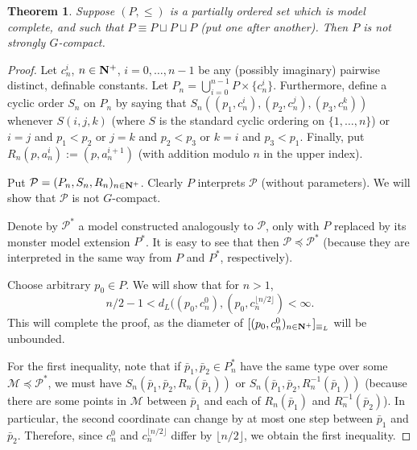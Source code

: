 \documentclass[final,a4paper,12pt]{amsart}
\newtheorem{thm}{Theorem}[section]
\theoremstyle{remark}
\theoremstyle{definition}
\newtheorem{clm}{Claim}
\newenvironment{clmproof}[1][\proofname]{\proof[#1]\renewcommand{\qedsymbol}{$\square$(claim)}}{\endproof}
\DeclareMathOperator{\Th}{{Th}}
\begin{document}
	\begin{thm}
		Suppose $(P,\leq)$ is a partially ordered set which is model complete, and such that $P\equiv P\sqcup P\sqcup P$ (put one after another). Then $P$ is not strongly $G$-compact.
	\end{thm}
	\begin{proof}
		Let $c_n^i$, $n\in {\bf N}^+$, $i=0,\ldots,n-1$ be any (possibly imaginary) pairwise distinct, definable constants. Let $P_n=\bigcup_{i=0}^{n-1} P\times \{c_n^i\}$. Furthermore, define a cyclic order $S_n$ on $P_n$ by saying that $S_n((p_1,c_n^i),(p_2,c_n^j),(p_3,c_n^k))$ whenever $S(i,j,k)$ (where $S$ is the standard cyclic ordering on $\{1,\ldots,n\}$) or $i=j$ and $p_1<p_2$ or $j=k$ and $p_2<p_3$ or $k=i$ and $p_3<p_1$. Finally, put $R_n(p,a_n^i):=(p,a_n^{i+1})$ (with addition modulo $n$ in the upper index).
		
		Put $\mathcal P=(P_n,S_n,R_n)_{n\in {\bf N}^+}$. Clearly $P$ interprets $\mathcal P$ (without parameters). We will show that $\mathcal P$ is not $G$-compact.
		
		Denote by $\mathcal P^*$ a model constructed analogously to $\mathcal P$, only with $P$ replaced by its monster model extension $P^*$. It is easy to see that then $\mathcal P\preceq \mathcal P^*$ (because they are interpreted in the same way from $P$ and $P^*$, respectively).
%		
		
		Choose arbitrary $p_0\in P$. We will show that for $n>1$,
		\[
			n/2-1<d_L((p_0,c_n^0),(p_0,c_n^{\lfloor n/2\rfloor})<\infty.
		\]
		This will complete the proof, as the diameter of $[(p_0,c_n^0)_{n\in {\bf N}^+}]_{\equiv_L}$ will be unbounded.
		
		For the first inequality, note that if $\bar p_1, \bar p_2\in P_n^*$ have the same type over some $\mathcal M\preceq \mathcal P^*$, we must have $S_n(\bar p_1,\bar p_2,R_n(\bar p_1))$ or $S_n(\bar p_1,\bar p_2,R_n^{-1}(\bar p_1))$ (because there are some points in $\mathcal M$ between $\bar p_1$ and each of $R_n(\bar p_1)$ and $R_n^{-1}(\bar p_2)$). In particular, the second coordinate can change by at most one step between $\bar p_1$ and $\bar p_2$. Therefore, since $c_n^0$ and $c_n^{\lfloor n/2\rfloor}$ differ by $\lfloor n/2\rfloor$, we obtain the first inequality.
		

\end{proof}
\end{document}
